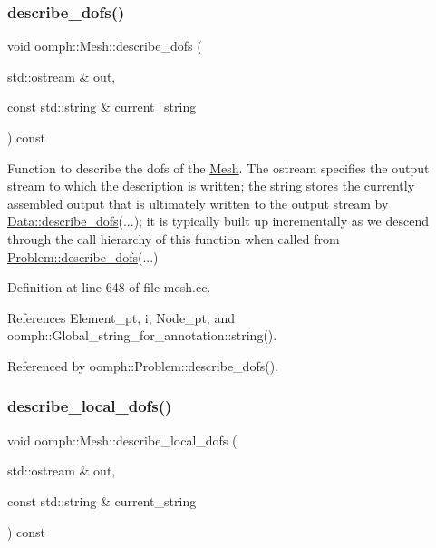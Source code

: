 \mbox{\label{classoomph_1_1Mesh_a86d000c45f6d29fa215b98051cc2d23f}} 
\subsubsection{\texorpdfstring{describe\+\_\+dofs()}{describe\_dofs()}}
{\footnotesize\ttfamily void oomph\+::\+Mesh\+::describe\+\_\+dofs (\begin{DoxyParamCaption}\item[{std\+::ostream \&}]{out,  }\item[{const std\+::string \&}]{current\+\_\+string }\end{DoxyParamCaption}) const\hspace{0.3cm}{\ttfamily [protected]}}



Function to describe the dofs of the \hyperlink{classoomph_1_1Mesh}{Mesh}. The ostream specifies the output stream to which the description is written; the string stores the currently assembled output that is ultimately written to the output stream by \hyperlink{classoomph_1_1Data_a2dae16e2dcff9a40029f834c83364df5}{Data\+::describe\+\_\+dofs}(...); it is typically built up incrementally as we descend through the call hierarchy of this function when called from \hyperlink{classoomph_1_1Problem_abc103804eb319ae0b3d43870cc3e1eaf}{Problem\+::describe\+\_\+dofs}(...) 



Definition at line 648 of file mesh.\+cc.



References Element\+\_\+pt, i, Node\+\_\+pt, and oomph\+::\+Global\+\_\+string\+\_\+for\+\_\+annotation\+::string().



Referenced by oomph\+::\+Problem\+::describe\+\_\+dofs().

\mbox{\label{classoomph_1_1Mesh_a57d57b7b6d7a32fadafb03e7055c5ad4}} 
\subsubsection{\texorpdfstring{describe\+\_\+local\+\_\+dofs()}{describe\_local\_dofs()}}
{\footnotesize\ttfamily void oomph\+::\+Mesh\+::describe\+\_\+local\+\_\+dofs (\begin{DoxyParamCaption}\item[{std\+::ostream \&}]{out,  }\item[{const std\+::string \&}]{current\+\_\+string }\end{DoxyParamCaption}) const\hspace{0.3cm}{\ttfamily [protected]}}



